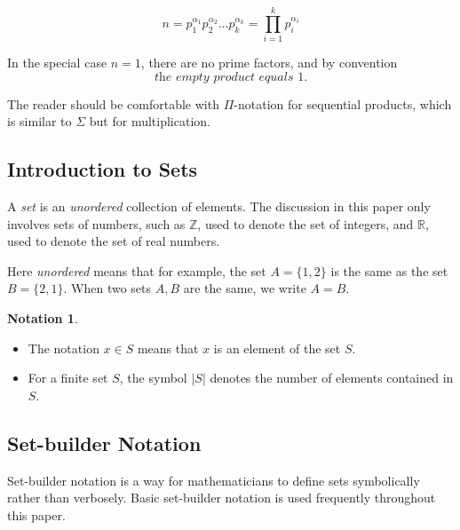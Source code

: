 \documentclass[a4paper, 12pt]{article}
\theoremstyle{definition}
\newtheorem*{notation}{Notation}
\begin{document}
\begin{equation}
  n = p_1^{\alpha_1} p_2^{\alpha_2} \dots p_k^{\alpha_k} = \prod_{i=1}^{k}p_i^{\alpha_i}
\end{equation}

In the special case $n=1$, there are no prime factors, and by convention
\begin{equation}
  \textit{the empty product equals 1.}
\end{equation}

The reader should be comfortable with $\Pi$-notation for sequential products, which is similar to $\Sigma$ but for multiplication.

\subsection{Introduction to Sets}
A \textit{set} is an \textit{unordered} collection of elements.
The discussion in this paper only involves sets of numbers, such as $\mathbb{Z}$, used to denote the set of integers,
and $\mathbb{R}$, used to denote the set of real numbers.

Here \textit{unordered} means that for example, the set $A =\{1, 2\}$ is the same as
the set $B=\{2, 1\}$.
When two sets $A, B$ are the same, we write $A = B$.\\

\noindent\begin{notation}
  \begin{itemize}
    Let $A$, $B$, and $S$ be sets.
    \item The notation $x \in S$ means that $x$ is an element of the set $S$.
    \item For a finite set $S$, the symbol $|S|$ denotes the number of elements contained in $S$.
  \end{itemize}
\end{notation}\vspace{0.5em}

\subsection{Set-builder Notation}
Set-builder notation is a way for mathematicians to define sets symbolically rather than verbosely.
Basic set-builder notation is used frequently throughout this paper.
\end{document}

